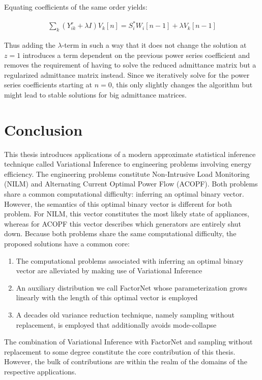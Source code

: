 \documentclass[11pt]{cmuthesis} %
\begin{document}
Equating coefficients of the same order yields:

\begin{align}
\sum_k (Y^r_{ik} + \lambda I)  V_k[n] = S_i^*W_i[n - 1] + \lambda V_k[n-1] \label{eq:scale_embed}
\end{align}

Thus adding the $\lambda$-term in such a way that it does not change the solution at $z=1$ introduces a term dependent on the previous power series coefficient and removes the requirement of having to solve the reduced admittance matrix but a regularized admittance matrix instead. Since we iteratively solve for the power series coefficients starting at $n=0$, this only slightly changes the algorithm but might lead to stable solutions for big admittance matrices.



\chapter{Conclusion}

This thesis introduces applications of a modern approximate statistical inference technique called Variational Inference to engineering problems involving energy efficiency. The engineering problems constitute Non-Intrusive Load Monitoring (NILM) and Alternating Current Optimal Power Flow (ACOPF). Both problems share a common computational difficulty: inferring an optimal binary vector. However, the semantics of this optimal binary vector is different for both problem. For NILM, this vector constitutes the most likely state of appliances, whereas for ACOPF this vector describes which generators are entirely shut down. Because both problems share the same computational difficulty, the proposed solutions have a common core:

\begin{enumerate}
\item The computational problems associated with inferring an optimal binary vector are alleviated by making use of Variational Inference
\item An auxiliary distribution we call FactorNet whose parameterization grows linearly with the length of this optimal vector is employed
\item A decades old variance reduction technique, namely sampling without replacement, is employed that additionally avoids mode-collapse
\end{enumerate}

The combination of Variational Inference with FactorNet and sampling without replacement to some degree constitute the core contribution of this thesis. However, the bulk of contributions are within the realm of the domains of the respective applications.\\
\end{document}
